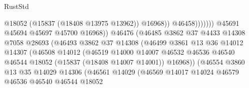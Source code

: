 \begin{lexlean}{RustStd}
\begin{coremodule}
{\begin{coremodule}
{{{{{{{{{{{{{{{{{{{{{{{{{{{{{{{{{{{{{{{{{{{{{{{{{{{{{{{{{{{{                                                      @18052
                                                      (@15837 (@18408 @13975 @13962))
                                                      @16968))
                                                  @46458)))))))
                                    @45691
                                    @45694
                                    @45697
                                    @45700
                                    @16968))
                                @46476
                                (@46485
                                  @3862
                                  @37
                                  @4433
                                  @14308
                                  @7058
                                  @28693
                                  (@46493
                                    @3862
                                    @37
                                    @14308
                                    (@46499
                                      @3861
                                      @13
                                      @36
                                      @14012
                                      @14307
                                      (@46508
                                        @14012
                                        (@46519
                                          @14000
                                          @14007
                                          @46532
                                          @46536
                                          @46540
                                          @46544
                                          @18052
                                          (@15837 (@18408 @14007 @14001))
                                          @16968))
                                      (@46554
                                        @3860
                                        @13
                                        @35
                                        @14029
                                        @14306
                                        (@46561
                                          @14029
                                          (@46569
                                            @14017
                                            @14024
                                            @46579
                                            @46536
                                            @46540
                                            @46544
                                            @18052
}}}}}}}}}}}}}}}}}}}}}}}}}}}}}}}}}}}}}}}}}}}}}}}}}}}}}}}}}}}}
\end{coremodule}}
\end{coremodule}
\end{lexlean}
